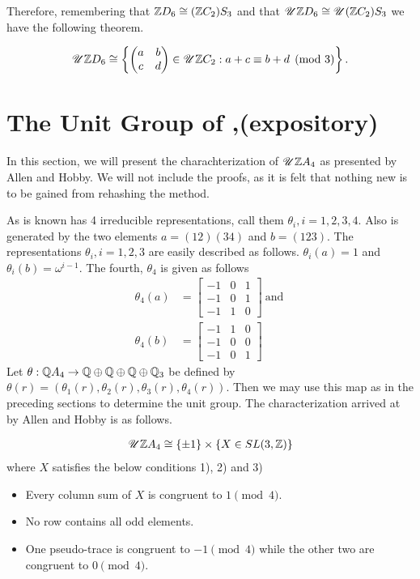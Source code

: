 \documentclass[11pt]{report}
\begin{document}
Therefore, remembering that $ \mathbb{Z}D_6 \cong ( \mathbb{Z}C_2)S_3$ and that
$\mathscr{U}{ \mathbb{Z}D_6} \cong \mathscr{U}{( \mathbb{Z}C_2)S_3}$ we have
the following theorem.

\begin{theorem}
\begin{align*}
\mathscr{U}{ \mathbb{Z}D_6}\cong \left\{
\begin{pmatrix}
a&b\\
c&d
\end{pmatrix}
\in \mathscr{U}{ \mathbb{Z}C_2} : a+c \equiv b+d \pmod{3}\right\}.
\end{align*}
\end{theorem}

\section{The Unit Group of \intaf,(expository)}
In this section, we will present the charachterization of $\mathscr{U}{ \mathbb{Z}A_4}$
as presented by Allen
and Hobby\cite{bib:allen1980}. We will not include the proofs, as it is felt that 
nothing new is to be gained from rehashing the method.

As is known \af{} has 4 irreducible representations, call them $\theta_i,i = 
1,2,3,4$. Also \af{} is
generated by the two elements $a=(1 2)(3 4)$ and $b=(1 2 3)$. The 
representations $\theta_i, i=1,2,3$ are easily described as follows. 
$\theta_i(a)=1$ and $\theta_i(b)=\omega^{i-1}$. The fourth, 
$\theta_4$ is given as follows
\begin{align*}
\theta_4(a) &=\begin{bmatrix}
-1&0&1\\
-1&0&1\\
-1&1&0
\end{bmatrix} \mathrm{\ and\ }\\
\theta_4(b) &=\begin{bmatrix}
-1&1&0\\
-1&0&0\\
-1&0&1
\end{bmatrix}
\end{align*}
Let $\theta: \mathbb{Q}A_4 \rightarrow  \mathbb{Q}\oplus \mathbb{Q}\oplus \mathbb{Q}\oplus \mathbb{Q}_3$
 be defined by $\theta(r) = (\theta_1(r),\theta_2(r),\theta_3(r),\theta_4(r))$.
 Then we may use this map as in the preceding sections to determine the unit 
group. The characterization
arrived at by Allen and Hobby is as follows.

\begin{theorem}
\begin{align*}
\mathscr{U}{ \mathbb{Z}A_4}\cong \{\pm 1\} \times \{X \in SL(3, \mathbb{Z})\}
\end{align*}
 where $X$ satisfies the below 
conditions 1), 2) and 3)

\begin{itemize}
\item{}Every column sum of $X$ is congruent to $1\pmod{4}$.
\item{}No row contains all odd elements.
\item{}One pseudo-trace is congruent to $-1\pmod{4}$ while the other two 
are congruent to $0\pmod{4}$.
\end{itemize}
\end{theorem}
\end{document}
